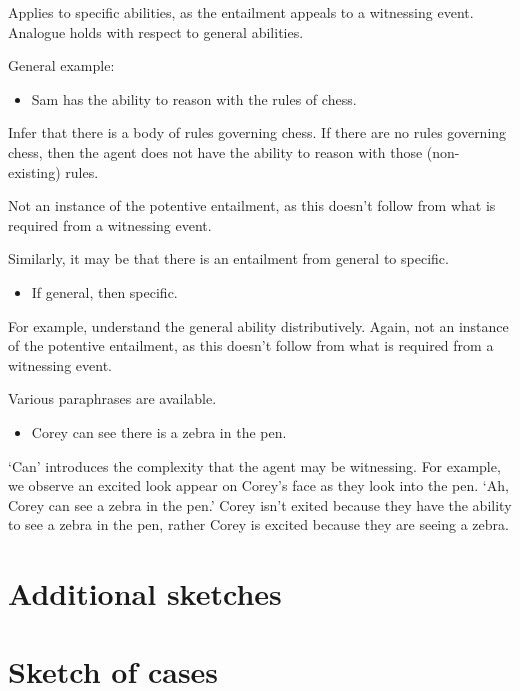 \begin{note}
  Applies to specific abilities, as the entailment appeals to a witnessing event.
  Analogue holds with respect to general abilities.

  General example:
  \begin{itemize}
  \item Sam has the ability to reason with the rules of chess.
  \end{itemize}
  Infer that there is a body of rules governing chess.
  If there are no rules governing chess, then the agent does not have the ability to reason with those (non-existing) rules.

  Not an instance of the potentive entailment, as this doesn't follow from what is required from a witnessing event.

  Similarly, it may be that there is an entailment from general to specific.
  \begin{itemize}
  \item If general, then specific.
  \end{itemize}
  For example, understand the general ability distributively.
  Again, not an instance of the potentive entailment, as this doesn't follow from what is required from a witnessing event.
\end{note}

\begin{note}
  Various paraphrases are available.
  \begin{itemize}
  \item Corey can see there is a zebra in the pen.
  \end{itemize}
  `Can' introduces the complexity that the agent may be witnessing.
  For example, we observe an excited look appear on Corey's face as they look into the pen.
  `Ah, Corey can see a zebra in the pen.'
  Corey isn't exited because they have the ability to see a zebra in the pen, rather Corey is excited because they are seeing a zebra.
\end{note}

\section{Additional sketches}
\label{sec:additional-sketches}


\newpage

\section{Sketch of cases}
\label{sec:sketch-cases}

